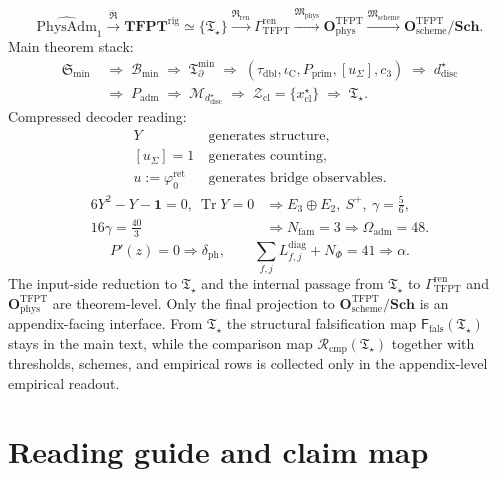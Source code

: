 \documentclass[11pt,a4paper]{article}
\theoremstyle{definition}
\theoremstyle{remark}
\DeclareMathOperator{\tr}{Tr}
\newcommand{\taudbl}{\tau_{\mathrm{dbl}}}
\newcommand{\iC}{\iota_{\mathrm C}}
\newcommand{\cthree}{c_3}
\newcommand{\phiz}{\varphi_0^{\mathrm{ret}}}
\newcommand{\Tbound}{\mathfrak T_{\partial}^{\min}}
\newcommand{\Padm}{P_{\mathrm{adm}}}
\newcommand{\Pprim}{P_{\mathrm{prim}}}
\newcommand{\Tstar}{\mathfrak T_{\star}}
\newcommand{\Ffals}{\mathsf F_{\mathrm{fals}}}
\newcommand{\Rcmp}{\mathcal R_{\mathrm{cmp}}}
\newcommand{\PhysAdmOne}{\widehat{\mathrm{PhysAdm}}_1}
\newcommand{\GrenTFPT}{\Gamma_{\mathrm{TFPT}}^{\mathrm{ren}}}
\newcommand{\OphysTFPT}{\mathbf O_{\mathrm{phys}}^{\mathrm{TFPT}}}
\newcommand{\OschemeTFPT}{\mathbf O_{\mathrm{scheme}}^{\mathrm{TFPT}}}
\newcommand{\SchGrp}{\mathbf{Sch}}
\newcommand{\Runiv}{\mathfrak R}
\newcommand{\Mphys}{\mathfrak M_{\mathrm{phys}}}
\newcommand{\Mscheme}{\mathfrak M_{\mathrm{scheme}}}
\newcommand{\Rren}{\mathfrak R_{\mathrm{ren}}}
\newcommand{\Runivrig}{\overline{\Runiv}}
\begin{document}
\begin{tcolorbox}[colback=tfptblue!2, colframe=tfptblue!40, breakable,
    title={Closed architecture of the paper}, colbacktitle=tfptblue!60]
\[
\PhysAdmOne
\xrightarrow{\Runivrig}
\mathbf{TFPT}^{\mathrm{rig}}
\simeq
\{\Tstar\}
\xrightarrow{\Rren}
\GrenTFPT
\xrightarrow{\Mphys}
\OphysTFPT
\xrightarrow{\Mscheme}
\OschemeTFPT/\SchGrp.
\]
Main theorem stack:
\[
\begin{aligned}
\mathfrak S_{\min}
&\;\Rightarrow\;
\mathcal B_{\min}
\;\Rightarrow\;
\Tbound
\;\Rightarrow\;
(\taudbl,\iC,\Pprim,[u_\Sigma],\cthree)
\;\Rightarrow\;
d^\star_{\mathrm{disc}}
\\
&\;\Rightarrow\;
\Padm
\;\Rightarrow\;
\mathcal M_{d^\star_{\mathrm{disc}}}
\;\Rightarrow\;
\mathcal Z_{\mathrm{cl}}=\{x^\star_{\mathrm{cl}}\}
\;\Rightarrow\;
\Tstar.
\end{aligned}
\]
Compressed decoder reading:
\[
\begin{aligned}
Y&\ \text{generates structure},\\
[u_\Sigma]=1&\ \text{generates counting},\\
u:=\phiz&\ \text{generates bridge observables}.
\end{aligned}
\]
\[
\begin{aligned}
6Y^2-Y-\mathbf 1=0,\ \tr Y=0
&\Rightarrow
E_3\oplus E_2,\ S^+,\ \gamma=\frac56,\\
16\gamma=\frac{40}{3}
&\Rightarrow
N_{\mathrm{fam}}=3
\Rightarrow
\Omega_{\mathrm{adm}}=48.
\end{aligned}
\]
\[
P'(z)=0
\Rightarrow
\delta_{\mathrm{ph}},
\qquad
\sum_{f,j}L_{f,j}^{\mathrm{diag}}+N_\Phi=41
\Rightarrow
\alpha.
\]
The input-side reduction to $\Tstar$ and the internal passage from $\Tstar$ to $\GrenTFPT$ and
$\OphysTFPT$ are theorem-level. Only the final projection to $\OschemeTFPT/\SchGrp$ is an
appendix-facing interface. From $\Tstar$ the structural falsification map $\Ffals(\Tstar)$ stays in
the main text, while the comparison map $\Rcmp(\Tstar)$ together with thresholds, schemes, and
empirical rows is collected only in the appendix-level empirical readout.
\end{tcolorbox}

\tableofcontents

\section{Reading guide and claim map}
\end{document}
